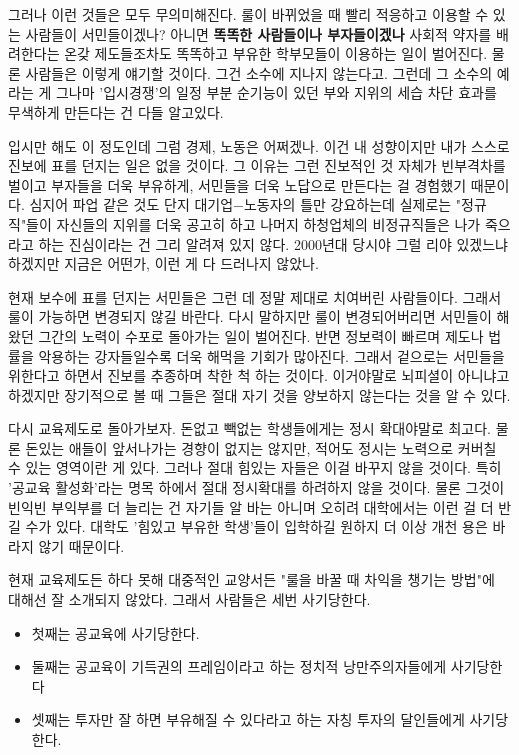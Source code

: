 그러나 이런 것들은 모두 무의미해진다.
룰이 바뀌었을 때 빨리 적응하고 이용할 수 있는 사람들이 서민들이겠나? 아니면 \textbf{똑똑한 사람들이나 부자들이겠나}
사회적 약자를 배려한다는 온갖 제도들조차도 똑똑하고 부유한 학부모들이 이용하는 일이 벌어진다.
물론 사람들은 이렇게 얘기할 것이다. 그건 소수에 지나지 않는다고.
그런데 그 소수의 예라는 게 그나마 '입시경쟁'의 일정 부분 순기능이 있던 부와 지위의 세습 차단 효과를 무색하게 만든다는 건 다들 알고있다.
\vspace{5mm}

입시만 해도 이 정도인데 그럼 경제, 노동은 어쩌겠나.
이건 내 성향이지만 내가 스스로 진보에 표를 던지는 일은 없을 것이다.
그 이유는 그런 진보적인 것 자체가 빈부격차를 벌이고 부자들을 더욱 부유하게, 서민들을 더욱 노답으로 만든다는 걸 경험했기 때문이다.
심지어 파업 같은 것도 단지 대기업$-$노동자의 틀만 강요하는데 실제로는 "정규직"들이 자신들의 지위를 더욱 공고히 하고
나머지 하청업체의 비정규직들은 나가 죽으라고 하는 진심이라는 건 그리 알려져 있지 않다.
2000년대 당시야 그럴 리야 있겠느냐 하겠지만 지금은 어떤가, 이런 게 다 드러나지 않았나.
\vspace{5mm}

현재 보수에 표를 던지는 서민들은 그런 데 정말 제대로 치여버린 사람들이다. 그래서 룰이 가능하면 변경되지 않길 바란다.
다시 말하지만 룰이 변경되어버리면 서민들이 해왔던 그간의 노력이 수포로 돌아가는 일이 벌어진다.
반면 정보력이 빠르며 제도나 법률을 악용하는 강자들일수록 더욱 해먹을 기회가 많아진다.
그래서 겉으로는 서민들을 위한다고 하면서 진보를 추종하며 착한 척 하는 것이다.
이거야말로 뇌피셜이 아니냐고 하겠지만 장기적으로 볼 때 그들은 절대 자기 것을 양보하지 않는다는 것을 알 수 있다.
\vspace{5mm}

다시 교육제도로 돌아가보자. 돈없고 빽없는 학생들에게는 정시 확대야말로 최고다.
물론 돈있는 애들이 앞서나가는 경향이 없지는 않지만, 적어도 정시는 노력으로 커버칠 수 있는 영역이란 게 있다.
그러나 절대 힘있는 자들은 이걸 바꾸지 않을 것이다. 특히 '공교육 활성화'라는 명목 하에서 절대 정시확대를 하려하지 않을 것이다.
물론 그것이 빈익빈 부익부를 더 늘리는 건 자기들 알 바는 아니며
오히려 대학에서는 이런 걸 더 반길 수가 있다. 대학도 '힘있고 부유한 학생'들이 입학하길 원하지 더 이상 개천 용은 바라지 않기 때문이다.
\vspace{5mm}

현재 교육제도든 하다 못해 대중적인 교양서든 "룰을 바꿀 때 차익을 챙기는 방법"에 대해선 잘 소개되지 않았다.
그래서 사람들은 세번 사기당한다.
\vspace{5mm}
\begin{itemize}
    \item 첫째는 공교육에 사기당한다.
    \item 둘째는 공교육이 기득권의 프레임이라고 하는 정치적 낭만주의자들에게 사기당한다
    \item 셋째는 투자만 잘 하면 부유해질 수 있다라고 하는 자칭 투자의 달인들에게 사기당한다.
\end{itemize}
\vspace{5mm}

